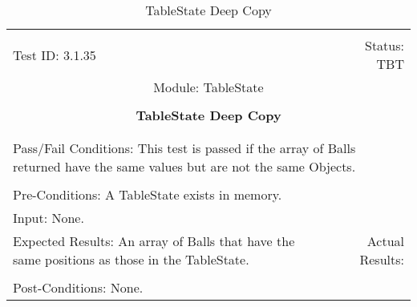 \documentclass[titlepage]{article}
\begin{document}
\begin{center}%
\begin{table}
\begin{tabular}{|l r|}\hline&\\[-2mm]
	Test ID: 3.1.35	&Status: TBT\\[-3mm]
	\multicolumn{2}{|c|}{Module: TableState}\\&\\
	\multicolumn{2}{|c|}{\textbf{\large{TableState Deep Copy}}}\\&\\\hline&\\[-3mm]
	\multicolumn{2}{|p{\textwidth}|}{Pass/Fail Conditions: This test is passed if the array of Balls returned have the same values but are not the same Objects.}\\[1mm]\hline&\\[-3mm]
	\multicolumn{2}{|p{\textwidth}|}{Pre-Conditions: A TableState exists in memory.}\\[4mm]
	\multicolumn{2}{|p{\textwidth}|}{Input: None.}\\[2mm]\hline
	\multicolumn{1}{|p{0.49\textwidth}}{Expected Results: An array of Balls that have the same positions as those in the TableState.}	&\multicolumn{1}{|p{0.45\textwidth}|}{Actual Results: }\\\hline&\\[-3mm]
	\multicolumn{2}{|p{\textwidth}|}{Post-Conditions: None.}\\\hline
\end{tabular}
\caption{TableState Deep Copy}
\end{table}
\end{center}
\end{document}
